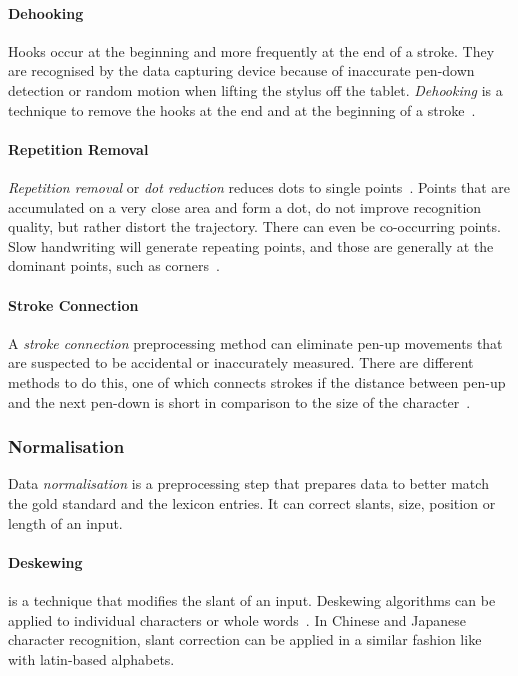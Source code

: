 \paragraph{Dehooking}
\label{sec:dehooking}
Hooks occur at the beginning and more frequently at the end of a stroke. They
are recognised by the data capturing device because of inaccurate pen-down 
detection or random motion when lifting the stylus off the tablet.
\emph{Dehooking} is a technique to remove the hooks at the end and at the 
beginning of a stroke~.

\paragraph{Repetition Removal}
\label{sec:repetitionremoval}
\emph{Repetition removal} or \emph{dot reduction} reduces dots to single 
points~. Points that are accumulated on a very close area and 
form a dot, do not improve recognition quality, but rather distort the 
trajectory. There can even be co-occurring points. Slow handwriting will generate
repeating points, and those are generally at the dominant points, such as
corners~.

\paragraph{Stroke Connection}
\label{sec:strokeconnection}
A \emph{stroke connection} preprocessing method can eliminate pen-up movements
that are suspected to be accidental or inaccurately measured. There are different
methods to do this, one of which connects strokes if the distance between pen-up
and the next pen-down is short in comparison to the size of the 
character~.

\subsubsection{Normalisation} 
\label{sec:normalisation}
Data \emph{normalisation} is a preprocessing step that prepares data to better
match the gold standard and the lexicon entries. It can correct slants, size, 
position or length of an input.

\paragraph{Deskewing}
is a technique that modifies the slant of an input. Deskewing 
algorithms can be applied to individual characters or 
whole words~. In Chinese and Japanese character recognition, 
slant correction can be applied in a similar fashion like with latin-based alphabets.

